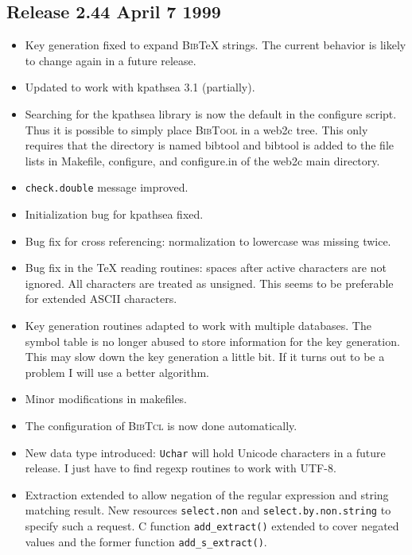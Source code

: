 \documentclass[11pt,a4paper]{scrartcl}
\newcommand\rsc[1]{\texttt{#1}}
\newcommand\BibTool{\textsc{BibTool}}
\newcommand\BibTcl{\textsc{BibTcl}}
\newcommand\BibTeX{\textsc{Bib}\TeX}
\newenvironment{Release}[2]{%
  \def\tmp{#2}%
  \section*{Release #1 \ifx\tmp\empty\else{\normalsize[#2]}\fi}
  \begin{itemize}
}{\end{itemize}}
\newenvironment{Fix}[1]{\item }{}
\newenvironment{New}[1]{\item }{}
\newenvironment{Update}[1]{\item }{}
\begin{document}
\begin{multicols}
 \begin{Release}{2.44}{April 7 1999}
  \begin{Fix}{gene}
    Key generation fixed to expand \BibTeX{} strings. The current
    behavior is likely to change again in a future release.
  \end{Fix}
  \begin{Update}{gene}
    Updated to work with kpathsea 3.1 (partially).
  \end{Update}
  \begin{New}{gene}
    Searching for the kpathsea library is now the default in the
    configure script. Thus it is possible to simply place \BibTool{}
    in a web2c tree. This only requires that the directory is named
    bibtool and bibtool is added to the file lists in Makefile,
    configure, and configure.in of the web2c main directory.
  \end{New}
  \begin{Fix}{gene}
    \rsc{check.double} message improved.
  \end{Fix}
  \begin{Fix}{gene}
    Initialization bug for kpathsea fixed.
  \end{Fix}
  \begin{Fix}{gene}
    Bug fix for cross referencing: normalization to lowercase was
    missing twice.
  \end{Fix}
  \begin{Fix}{gene}
    Bug fix in the \TeX{} reading routines: spaces after active
    characters are not ignored. All characters are treated as
    unsigned. This seems to be preferable for extended ASCII
    characters.
  \end{Fix}
  \begin{Update}{gene}
    Key generation routines adapted to work with multiple databases.
    The symbol table is no longer abused to store information for the
    key generation. This may slow down the key generation a little
    bit. If it turns out to be a problem I will use a better
    algorithm.
  \end{Update}
  \begin{Update}{gene}
    Minor modifications in makefiles.
  \end{Update}
  \begin{New}{gene}
    The configuration of \BibTcl{} is now done automatically.
  \end{New}
  \begin{New}{gene}
    New data type introduced: \verb|Uchar| will hold Unicode characters in a
    future release. I just have to find regexp routines to work with UTF-8.
  \end{New}
  \begin{Update}{gene}
    Extraction extended to allow negation of the regular expression and string
    matching result. New resources \rsc{select.non} and
    \rsc{select.by.non.string} to specify such a request. C function
    \verb|add_extract()| extended to cover negated values and the former
    function \verb|add_s_extract()|.
  \end{Update}
 \end{Release}


\end{multicols}
\end{document}
